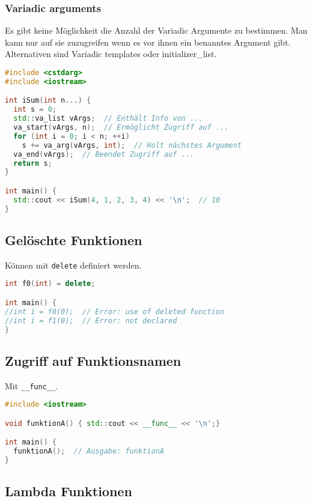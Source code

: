 \subsubsection{Variadic arguments}

Es gibt keine Möglichkeit die Anzahl der Variadic Argumente zu bestimmen. Man
kann nur auf sie zuzugreifen wenn es vor ihnen ein benanntes Argument gibt.
Alternativen sind Variadic templates oder initializer\_list.

\begin{lstlisting}[language=C++]
#include <cstdarg>
#include <iostream>

int iSum(int n...) {
  int s = 0;
  std::va_list vArgs;  // Enthält Info von ...
  va_start(vArgs, n);  // Ermöglicht Zugriff auf ...
  for (int i = 0; i < n; ++i)
    s += va_arg(vArgs, int);  // Holt nächstes Argument
  va_end(vArgs);  // Beendet Zugriff auf ...
  return s;
}

int main() {
  std::cout << iSum(4, 1, 2, 3, 4) << '\n';  // 10
}
\end{lstlisting}

\subsection{Gelöschte Funktionen}

Können mit \lstinline|delete| definiert werden.

\begin{lstlisting}[language=C++]
int f0(int) = delete;

int main() {
//int i = f0(0);  // Error: use of deleted function
//int i = f1(0);  // Error: not declared
}
\end{lstlisting}

\subsection{Zugriff auf Funktionsnamen}

Mit \lstinline|__func__|.

\begin{lstlisting}[language=C++]
#include <iostream>

void funktionA() { std::cout << __func__ << '\n';}

int main() {
  funktionA();  // Ausgabe: funktionA
}
\end{lstlisting}

\subsection{Lambda Funktionen}

